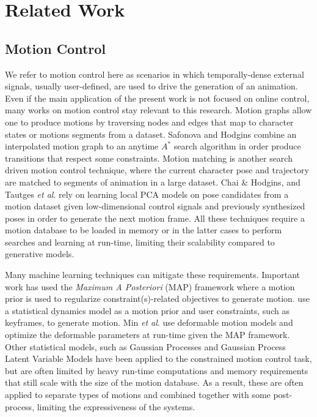 \documentclass[acmtog]{acmart}
\newcommand{\etal}{\textit{et al}. }
\begin{document}
\section{Related Work}
\subsection{Motion Control}
We refer to motion control here as scenarios in which temporally-dense external signals, usually user-defined, are used to drive the generation of an animation. Even if the main application of the present work is not focused on online control, many works on motion control stay relevant to this research. Motion graphs \cite{arikan2002interactive, lee2002interactive, beaudoin2008motion, kovar2008motion} allow one to produce motions by traversing nodes and edges that map to character states or motions segments from a dataset. Safonova and Hodgins \cite{safonova2007construction} combine an interpolated motion graph to an anytime $A^*$ search algorithm in order produce transitions that respect some constraints. Motion matching \cite{ButtnerNuclai} is another search driven motion control technique, where the current character pose and trajectory are matched to segments of animation in a large dataset. Chai \& Hodgins, and Tautges \etal {} rely on learning local PCA models on pose candidates from a motion dataset given low-dimensional control signals and previously synthesized poses in order to generate the next motion frame. All these techniques require a motion database to be loaded in memory or in the latter cases to perform searches and learning at run-time, limiting their scalability compared to generative models.

 Many machine learning techniques can mitigate these requirements. Important work has used the \textit{Maximum A Posteriori} (MAP) framework where a motion prior is used to regularize constraint(s)-related objectives to generate motion. \cite{chai2007constraint} use a statistical dynamics model as a motion prior and user constraints, such as keyframes, to generate motion. Min \etal {} use deformable motion models and optimize the deformable parameters at run-time given the MAP framework. Other statistical models, such as Gaussian Processes \cite{min2012motion} and Gaussian Process Latent Variable Models \cite{grochow2004style, levine2012continuous, wang2008gaussian, ye2010synthesis} have been applied to the constrained motion control task, but are often limited by heavy run-time computations and memory requirements that still scale with the size of the motion database. As a result, these are often applied to separate types of motions and combined together with some post-process, limiting the expressiveness of the systems.
\end{document}
